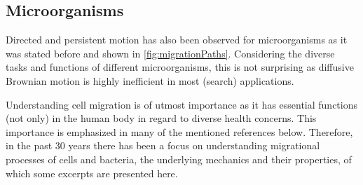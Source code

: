 \subsection*{Microorganisms}
Directed and persistent motion has also been observed for microorganisms as it was stated before and shown in \autoref{fig:migrationPaths}. Considering the diverse tasks and functions of different microorganisms, this is not surprising as diffusive Brownian motion is highly inefficient in most (search) applications.

Understanding cell migration is of utmost importance as it has essential functions (not only) in the human body in regard to diverse health concerns. This importance is emphasized in many of the mentioned references below. Therefore, in the past 30 years there has been a focus on understanding migrational processes of cells and bacteria, the underlying mechanics and their properties, of which some excerpts are presented here.
